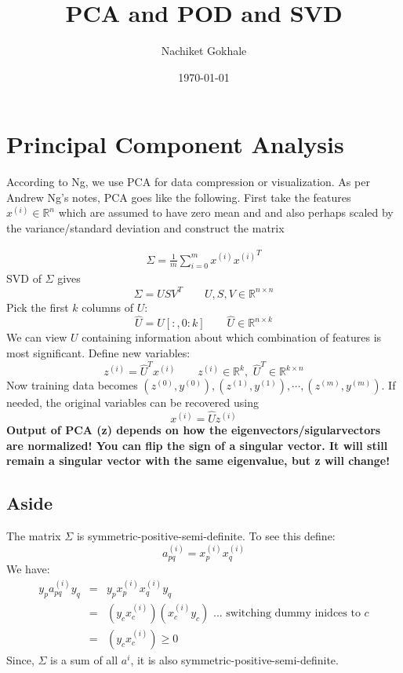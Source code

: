 \documentclass{article}
\newcommand{\beq}{\begin{equation}}
\newcommand{\eeq}{\end{equation}}
\newcommand{\ber}{\begin{eqnarray}}
\newcommand{\eer}{\end{eqnarray}}
\begin{document}
\title{PCA and POD and SVD}
\author{Nachiket Gokhale}
\date{\today}
\maketitle
\section{Principal Component Analysis}
According to Ng, we use PCA for data compression or visualization. As per Andrew Ng's notes, PCA goes like the following. First take the features $x^{(i)} \in \mathbb{R}^n$ which are assumed to have zero mean and and also perhaps scaled by the variance/standard deviation and construct the matrix

\ber
\label{eqn:discretexxt}
\Sigma = \frac{1}{m}\sum_{i=0}^{m}x^{(i)}{x^{(i)}}^{T}
\eer
%
SVD of $\Sigma$ gives
\beq
\Sigma = USV^{T} \qquad U,S,V \in \mathbb{R}^{n\times{n}}
\eeq
Pick the first $k$ columns of $U$:
\beq
\hat{U} = U[:,0:k]  \qquad \hat{U} \in \mathbb{R}^{n\times{k}}
\eeq
We can view $U$ containing information about which combination of features is most significant.
Define new variables:
\beq
z^{(i)}   = {\hat{U}}^{T}x^{(i)} \qquad z^{(i)} \in \mathbb{R}^{k},\,\, {\hat{U}}^{T} \in \mathbb{R}^{k\times{n}}
\eeq
Now training data becomes $(z^{(0)},y^{(0)}), (z^{(1)},y^{(1)}), \cdots, (z^{(m)},y^{(m)})$. If needed, the original variables can be recovered using
\beq
x^{(i)} = \hat{U}z^{(i)}
\eeq
\textbf{Output of PCA (z) depends on how the eigenvectors/sigularvectors are normalized! You can flip the sign of a singular vector. It will still remain a singular vector with the same eigenvalue, but z will change!}
%
%
%
\subsection{Aside} 
The matrix $\Sigma$ is symmetric-positive-semi-definite. To see this define:
\beq
a_{pq}^{(i)} = x^{(i)}_{p}{x^{(i)}_{q}}
\eeq
We have:
\ber
y_{p}a_{pq}^{(i)}y_{q} &=& y_{p}x^{(i)}_{p}{x^{(i)}_{q}}y_{q}  \\
&=& (y_{c}x^{(i)}_{c})({x^{(i)}_{c}}y_{c}) \text{ ... switching dummy inidces to }c\\
&=& (y_{c}x^{(i)}_{c}) \ge 0
\eer
Since, $\Sigma$ is a sum of all $a^{i}$, it is also symmetric-positive-semi-definite.
\end{document}
